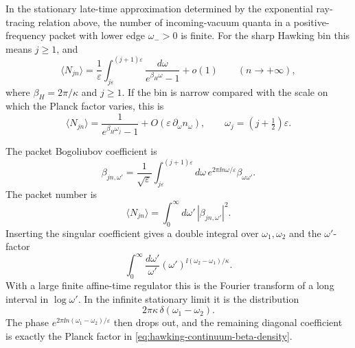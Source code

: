 \begin{controlledapproximation}
\label{ca:hawking-wave-packet-occupation}
In the stationary late-time approximation determined by the exponential
ray-tracing relation above, the number of incoming-vacuum quanta in a
positive-frequency packet with lower edge \(\omega_->0\) is finite.  For the
sharp Hawking bin this means \(j\ge1\), and
\begin{equation}
  \langle N_{jn}\rangle
  =
  \frac1{\varepsilon}
  \int_{j\varepsilon}^{(j+1)\varepsilon}
  \frac{d\omega}{e^{\beta_H\omega}-1}
  +o(1)
  \qquad(n\to+\infty),
  \label{eq:hawking-packet-bin-average}
\end{equation}
where \(\beta_H=2\pi/\kappa\) and \(j\ge1\).  If the bin is narrow compared
with the scale on which the Planck factor varies, this is
\[
  \langle N_{jn}\rangle
  =
  \frac{1}{e^{\beta_H\omega_j}-1}
  +O(\varepsilon\,\partial_\omega n_\omega),
  \qquad \omega_j=(j+\tfrac12)\varepsilon .
\]

The packet Bogoliubov coefficient is
\[
  \beta_{jn,\omega'}
  =
  \frac1{\sqrt\varepsilon}
  \int_{j\varepsilon}^{(j+1)\varepsilon}
  d\omega\,e^{2\pi\ii n\omega/\varepsilon}
  \beta_{\omega\omega'} .
\]
The packet number is
\[
  \langle N_{jn}\rangle
  =
  \int_0^\infty d\omega'\,|\beta_{jn,\omega'}|^2 .
\]
Inserting the singular coefficient gives a double integral over
\(\omega_1,\omega_2\) and the \(\omega'\)-factor
\[
  \int_0^\infty
  \frac{d\omega'}{\omega'}
  (\omega')^{\ii(\omega_2-\omega_1)/\kappa}.
\]
With a large finite affine-time regulator this is the Fourier transform of a
long interval in \(\log\omega'\).  In the infinite stationary limit it is the
distribution
\begin{equation}
  2\pi\kappa\,\delta(\omega_1-\omega_2).
  \label{eq:hawking-log-frequency-delta}
\end{equation}
The phase \(e^{2\pi\ii n(\omega_1-\omega_2)/\varepsilon}\) then drops out,
and the remaining diagonal coefficient is exactly the Planck factor in
\eqref{eq:hawking-continuum-beta-density}.


\end{controlledapproximation}
